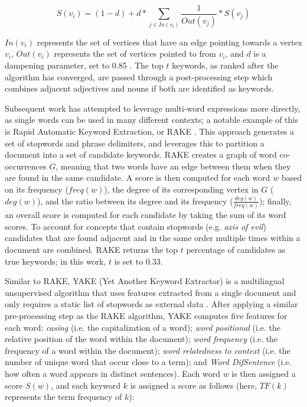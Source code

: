 \documentclass[thesis.tex]{subfiles}
\begin{document}
\begin{equation}
S(v_i) = (1 - d) + d*\sum_{j \in In(v_i)} \frac{1}{Out(v_j)} * S(v_j)
\end{equation}

$In(v_i)$ represents the set of vertices that have an edge pointing towards a vertex $v_i$, $Out(v_i)$ represents the set of vertices pointed to from $v_i$, and $d$ is a dampening parameter, set to 0.85 \citep{mihalcea2004textrank}. The top $t$ keywords, as ranked after the algorithm has converged, are passed through a post-processing step which combines adjacent adjectives and nouns if both are identified as keywords.

Subsequent work has attempted to leverage multi-word expressions more directly, as single words can be used in many different contexts; a notable example of this is Rapid Automatic Keyword Extraction, or RAKE \citep{rose2010automatic}. This approach generates a set of stopwords and phrase delimiters, and leverages this to partition a document into a set of candidate keywords. RAKE creates a graph of word co-occurrences $G$, meaning that two words have an edge between them when they are found in the same candidate. A score is then computed for each word $w$ based on its frequency ($freq(w)$), the degree of its corresponding vertex in $G$ ($deg(w)$), and the ratio between its degree and its frequency ($\frac{deg(w)}{freq(w)}$); finally, an overall score is computed for each candidate by taking the sum of its word scores. To account for concepts that contain stopwords (e.g. \textit{axis of evil}) candidates that are found adjacent and in the same order multiple times within a document are combined. RAKE returns the top $t$ percentage of candidates as true keywords; in this work, $t$ is set to 0.33.

Similar to RAKE, YAKE (Yet Another Keyword Extractor) is a multilingual unsupervised algorithm that uses features extracted from a single document and only requires a static list of stopwords as external data \citep{campos2020yake}. After applying a similar pre-processing step as the RAKE algorithm, YAKE computes five features for each word: \textit{casing} (i.e. the capitalization of a word); \textit{word positional} (i.e. the relative position of the word within the document); \textit{word frequency} (i.e. the frequency of a word within the document); \textit{word relatedness to context} (i.e. the number of unique word that occur close to a term); and \textit{Word DifSentence} (i.e. how often a word appears in distinct sentences). Each word $w$ is then assigned a score $S(w)$, and each keyword $k$ is assigned a score as follows (here, $TF(k)$ represents the term frequency of $k$):
\end{document}
